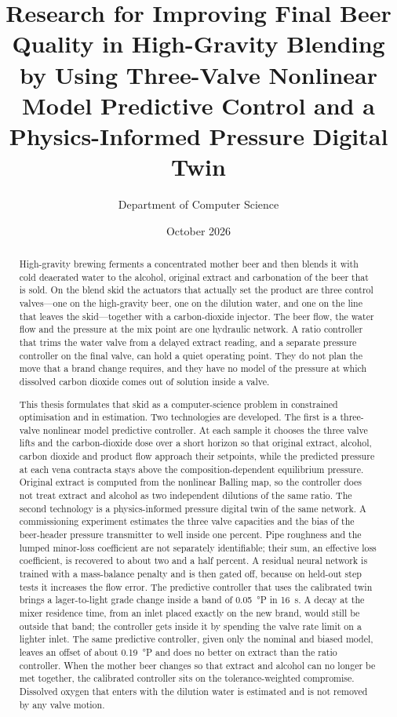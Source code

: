 \documentclass[12pt,a4paper]{report}
\title{Research for Improving Final Beer Quality in High-Gravity Blending by Using Three-Valve Nonlinear Model Predictive Control and a Physics-Informed Pressure Digital Twin}
\author{Department of Computer Science}
\date{October 2026}
\numberwithin{equation}{chapter}
\numberwithin{figure}{chapter}
\numberwithin{table}{chapter}
\begin{document}
\maketitle

\begin{abstract}
\noindent
High-gravity brewing ferments a concentrated mother beer and then blends it with cold deaerated water to the alcohol, original extract and carbonation of the beer that is sold. On the blend skid the actuators that actually set the product are three control valves---one on the high-gravity beer, one on the dilution water, and one on the line that leaves the skid---together with a carbon-dioxide injector. The beer flow, the water flow and the pressure at the mix point are one hydraulic network. A ratio controller that trims the water valve from a delayed extract reading, and a separate pressure controller on the final valve, can hold a quiet operating point. They do not plan the move that a brand change requires, and they have no model of the pressure at which dissolved carbon dioxide comes out of solution inside a valve.

This thesis formulates that skid as a computer-science problem in constrained optimisation and in estimation. Two technologies are developed. The first is a three-valve nonlinear model predictive controller. At each sample it chooses the three valve lifts and the carbon-dioxide dose over a short horizon so that original extract, alcohol, carbon dioxide and product flow approach their setpoints, while the predicted pressure at each vena contracta stays above the composition-dependent equilibrium pressure. Original extract is computed from the nonlinear Balling map, so the controller does not treat extract and alcohol as two independent dilutions of the same ratio. The second technology is a physics-informed pressure digital twin of the same network. A commissioning experiment estimates the three valve capacities and the bias of the beer-header pressure transmitter to well inside one percent. Pipe roughness and the lumped minor-loss coefficient are not separately identifiable; their sum, an effective loss coefficient, is recovered to about two and a half percent. A residual neural network is trained with a mass-balance penalty and is then gated off, because on held-out step tests it increases the flow error. The predictive controller that uses the calibrated twin brings a lager-to-light grade change inside a band of \SI{0.05}{\degree}P in \SI{16}{\second}. A decay at the mixer residence time, from an inlet placed exactly on the new brand, would still be outside that band; the controller gets inside it by spending the valve rate limit on a lighter inlet. The same predictive controller, given only the nominal and biased model, leaves an offset of about \SI{0.19}{\degree}P and does no better on extract than the ratio controller. When the mother beer changes so that extract and alcohol can no longer be met together, the calibrated controller sits on the tolerance-weighted compromise. Dissolved oxygen that enters with the dilution water is estimated and is not removed by any valve motion.


\end{abstract}
\end{document}
